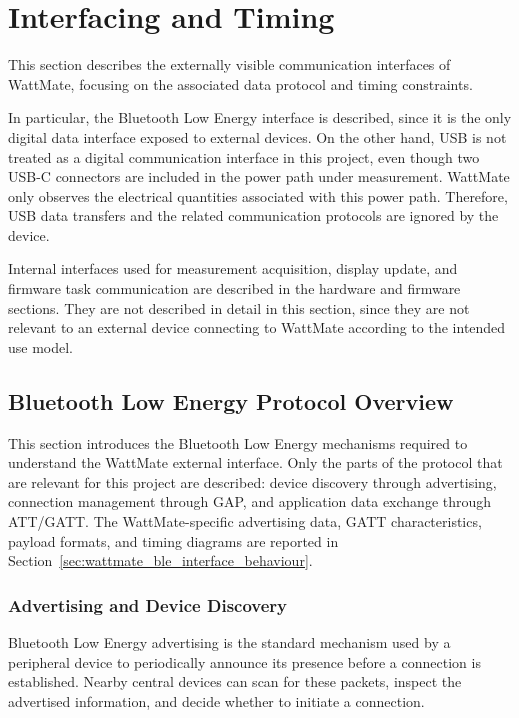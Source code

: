 
\chapter{Interfacing and Timing}

This section describes the externally visible communication interfaces of WattMate, focusing on the associated data protocol and timing constraints.

In particular, the Bluetooth Low Energy interface is described, since it is the only digital data interface exposed to external devices. 
On the other hand, USB is not treated as a digital communication interface in this project, even though two USB-C connectors are included in the power path under measurement. 
WattMate only observes the electrical quantities associated with this power path. 
Therefore, USB data transfers and the related communication protocols are ignored by the device.

Internal interfaces used for measurement acquisition, display update, and firmware task communication are described in the hardware and firmware sections. 
They are not described in detail in this section, since they are not relevant to an external device connecting to WattMate according to the intended use model.


\section{Bluetooth Low Energy Protocol Overview}
\label{sec:ble_protocol_overview}

This section introduces the Bluetooth Low Energy mechanisms required to understand the WattMate external interface. 
Only the parts of the protocol that are relevant for this project are described: device discovery through advertising, connection management through GAP, and application data exchange through ATT/GATT. 
The WattMate-specific advertising data, GATT characteristics, payload formats, and timing diagrams are reported in Section~\ref{sec:wattmate_ble_interface_behaviour}.

\subsection{Advertising and Device Discovery}
\label{sec:ble_advertising_discovery}

Bluetooth Low Energy advertising is the standard mechanism used by a peripheral device to periodically announce its presence before a connection is established. 
Nearby central devices can scan for these packets, inspect the advertised information, and decide whether to initiate a connection.

